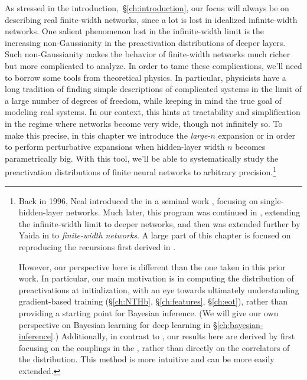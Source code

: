 As stressed in the introduction,~\S\ref{ch:introduction}, our focus will always be on describing real finite-width networks, since a lot is lost in idealized infinite-width networks.
One salient phenomenon lost in the infinite-width limit is the increasing non-Gaussianity in the preactivation distributions of deeper layers.
Such non-Gaussianity makes the behavior of finite-width networks much richer but more complicated to analyze.
In order to tame these complications, we'll
need to
borrow
some tools from theoretical physics. 
In particular, physicists have a long tradition of finding simple descriptions of complicated systems in the limit of a large number of degrees of freedom, while keeping in mind the true goal of modeling real systems. In our context, this hints at tractability and simplification in the regime where networks become very wide, though not infinitely so.
To make this precise, in this chapter we introduce the \emph{large-}$n$ expansion or   in order to perform perturbative expansions when hidden-layer width $n$ becomes parametrically big.
With this tool, we'll be able to systematically study the preactivation distributions of finite neural networks to arbitrary precision.\footnote{
Back in 1996, Neal introduced the  in a seminal work \cite{neal1996priors}, focusing on single-hidden-layer networks.  Much later, this program was continued in \cite{lee2018deep,matthews2018gaussian}, extending the infinite-width limit to deeper networks, and then was extended further by Yaida   
in \cite{Yaida2019} to \emph{finite-width networks}. A large part of this chapter is focused on reproducing the recursions first derived in \cite{Yaida2019}.

However, our perspective here is different than the one taken in this prior work. In particular, our main motivation is in computing the  distribution of preactivations at initialization, with an eye towards ultimately understanding gradient-based training (\S\ref{ch:NTHb}, \S\ref{ch:features}, \S\ref{ch:eot}), rather than providing a starting point for Bayesian inference. (We will give our own perspective on Bayesian learning for deep learning in \S\ref{ch:bayesian-inference}.) Additionally, in contrast to \cite{Yaida2019}, our results here are derived by first focusing on the couplings in the , rather than directly on the correlators of the distribution. This method is more intuitive and can be more easily extended.
}







